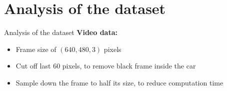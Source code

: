 \section{Analysis of the dataset}

\begin{frame}{Analysis of the dataset}
	\textbf{Video data:}
	\begin{itemize}
		\item<+-> Frame size of $(640,480,3)$ pixels
		\item<+-> Cut off last 60 pixels, to remove black frame inside the car
		\item<+-> Sample down the frame to half its size, to reduce computation time
	\end{itemize}
	
	\begin{columns}[t]
		\begin{column}{.45\textwidth}
			\begin{center}
			\end{center}
		\end{column}
		\begin{column}{.45\textwidth}
			\begin{center}
\end{center}
\end{column}
\end{columns}
\end{frame}
